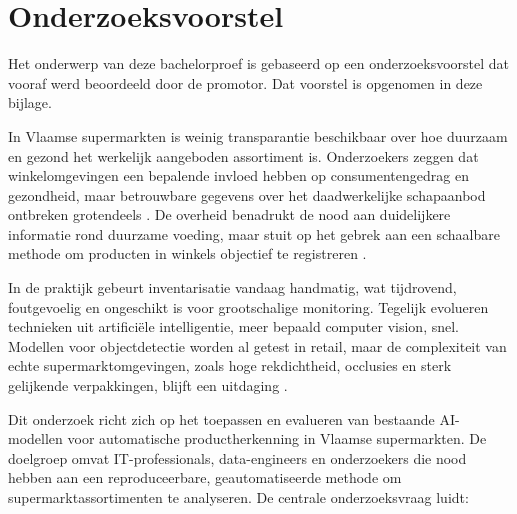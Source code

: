 \documentclass[dutch,dit,thesis]{hogentreport}
\begin{document}








%
%




\appendix

\chapter{Onderzoeksvoorstel}

Het onderwerp van deze bachelorproef is gebaseerd op een onderzoeksvoorstel dat vooraf werd beoordeeld door de promotor. Dat voorstel is opgenomen in deze bijlage.


In Vlaamse supermarkten is weinig transparantie beschikbaar over hoe duurzaam en gezond het werkelijk aangeboden assortiment is. Onderzoekers zeggen dat winkelomgevingen een bepalende invloed hebben op consumentengedrag en gezondheid, maar betrouwbare gegevens over het daadwerkelijke schapaanbod ontbreken grotendeels \autocite{wur2025, rug2024}. De overheid benadrukt de nood aan duidelijkere informatie rond duurzame voeding, maar stuit op het gebrek aan een schaalbare methode om producten in winkels objectief te registreren \autocite{rvo2025}.

In de praktijk gebeurt inventarisatie vandaag handmatig, wat tijdrovend, foutgevoelig en ongeschikt is voor grootschalige monitoring. Tegelijk evolueren technieken uit artificiële intelligentie, meer bepaald computer vision, snel. Modellen voor objectdetectie worden al getest in retail, maar de complexiteit van echte supermarktomgevingen, zoals hoge rekdichtheid, occlusies en sterk gelijkende verpakkingen, blijft een uitdaging \autocite{santra2019, fuchs2019}.

Dit onderzoek richt zich op het toepassen en evalueren van bestaande AI-modellen voor automatische productherkenning in Vlaamse supermarkten. De doelgroep omvat IT-professionals, data-engineers en onderzoekers die nood hebben aan een reproduceerbare, geautomatiseerde methode om supermarktassortimenten te analyseren. De centrale onderzoeksvraag luidt:
\end{document}
